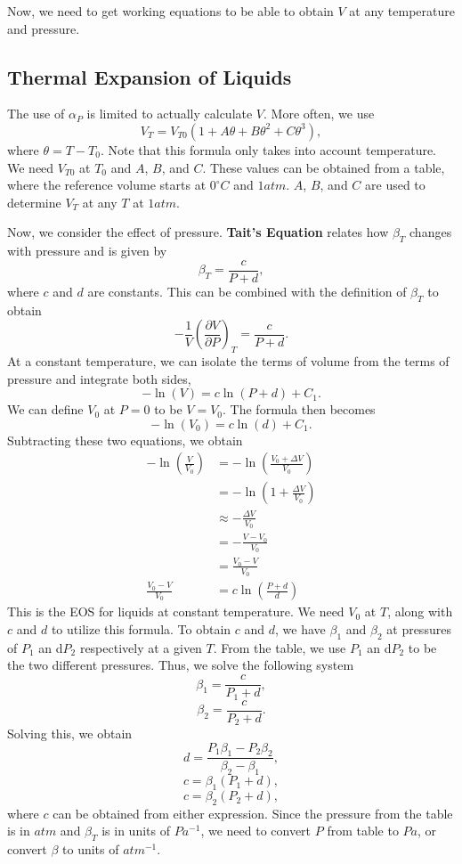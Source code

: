 \documentclass[11pt]{article}
\theoremstyle{plain} %
\theoremstyle{definition}
\theoremstyle{example}
\theoremstyle{remark}
\begin{document}
Now, we need to get working equations to be able to obtain $V$ at any temperature and pressure. 

\subsection{Thermal Expansion of Liquids}
The use of $\alpha_P$ is limited to actually calculate $V$. More often, we use 
$$V_T = V_{T0}(1+A\theta + B\theta^2 + C\theta^3),$$
where $\theta = T-T_0$. Note that this formula only takes into account temperature. We need $V_{T0}$ at $T_0$ and $A$, $B$, and $C$. These values can be obtained from a table, where the reference volume starts at $0^{\circ}C$ and $1atm$. $A$, $B$, and $C$ are used to determine $V_T$ at any $T$ at $1atm$. 

Now, we consider the effect of pressure. \textbf{Tait's Equation} relates how $\beta_T$ changes with pressure and is given by 
$$\beta_T = \frac{c}{P+d},$$
where $c$ and $d$ are constants. This can be combined with the definition of $\beta_T$ to obtain 
$$-\frac{1}{V}\left(\frac{\partial V}{\partial P}\right)_T = \frac{c}{P+d}.$$
At a constant temperature, we can isolate the terms of volume from the terms of pressure and integrate both sides,
$$-\ln(V) = c\ln(P+d)+C_1.$$
We can define $V_0$ at $P = 0$ to be $V = V_0$. The formula then becomes 
$$-\ln(V_0)=c\ln(d) + C_1.$$
Subtracting these two equations, we obtain 
\begin{align*}
	-\ln\left(\frac{V}{V_0}\right)
	&= -\ln\left(\frac{V_0+\Delta V}{V_0}\right)\\
	&= -\ln\left(1+\frac{\Delta V}{V_0}\right)\\
	&\approx -\frac{\Delta V}{V_0}\\
	&= -\frac{V-V_0}{V_0}\\
	&= \frac{V_0-V}{V_0}\\
	\frac{V_0-V}{V_0}&= c\ln\left(\frac{P+d}{d}\right)
\end{align*}
This is the EOS for liquids at constant temperature. We need $V_0$ at $T$, along with $c$ and $d$ to utilize this formula. To obtain $c$ and $d$, we have $\beta_1$ and $\beta_2$ at pressures of $P_1$ an d$P_2$ respectively at a given $T$. From the table, we use $P_1$ an d$P_2$ to be the two different pressures. Thus, 
we solve the following system 
$$\beta_1 = \frac{c}{P_1+d},$$
$$\beta_2= \frac{c}{P_2+d}.$$
Solving this, we obtain $$d = \frac{P_1\beta_1 -P_2\beta_2}{\beta_2-\beta_1},$$
$$c = \beta_1(P_1+d),$$
$$c = \beta_2(P_2+d),$$
where $c$ can be obtained from either expression. Since the pressure from the table is in $atm$ and $\beta_T$ is in units of $Pa^{-1}$, we need to convert $P$  from table to $Pa$, or convert $\beta$ to units of $atm^{-1}$. 
\end{document}
